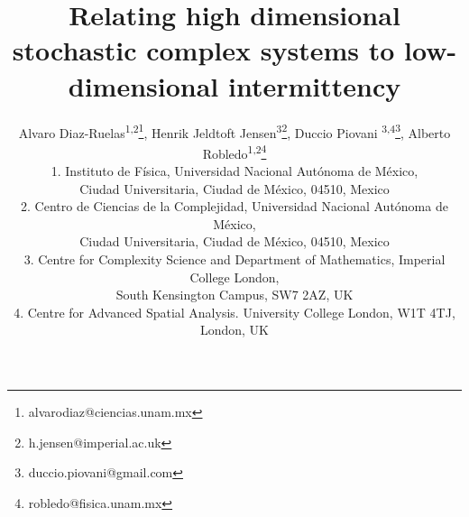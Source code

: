 \documentclass[12pt]{article}
\date{}
\begin{document}
\title{\LARGE \bf Relating high dimensional stochastic complex systems to low-dimensional intermittency}

%


\author{Alvaro Diaz-Ruelas\textsuperscript{1,2}\thanks{alvarodiaz@ciencias.unam.mx}, Henrik Jeldtoft Jensen\textsuperscript{3}\thanks{h.jensen@imperial.ac.uk},  Duccio Piovani \textsuperscript{3,4}\thanks{duccio.piovani@gmail.com}, Alberto Robledo\textsuperscript{1,2}\thanks{robledo@fisica.unam.mx}\vspace*{12pt}\\ 
\footnotesize 1. Instituto de F\'isica, Universidad Nacional Aut\'onoma de M\'exico, \\ \footnotesize Ciudad Universitaria, Ciudad de M\'exico, 04510, Mexico  \\ \footnotesize 2. Centro de Ciencias de la Complejidad, Universidad Nacional Aut\'onoma de M\'exico, \\ \footnotesize Ciudad Universitaria, Ciudad de M\'exico, 04510, Mexico \\ \footnotesize 3. Centre for Complexity Science and Department of Mathematics, Imperial College London, \\ \footnotesize South Kensington Campus, SW7 2AZ, UK \\ \footnotesize 4. Centre for Advanced Spatial Analysis. University College London, W1T 4TJ, London, UK}
			


\maketitle
\end{document}
